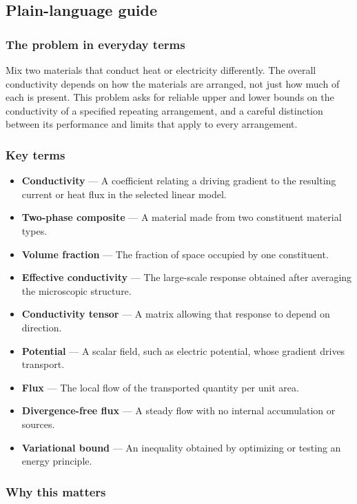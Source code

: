 \documentclass[
  11pt,
]{article}
\begin{document}
\subsection{Plain-language guide}

\subsubsection{The problem in everyday terms}

Mix two materials that conduct heat or electricity differently. The
overall conductivity depends on how the materials are arranged, not just
how much of each is present. This problem asks for reliable upper and
lower bounds on the conductivity of a specified repeating arrangement,
and a careful distinction between its performance and limits that apply
to every arrangement.

\subsubsection{Key terms}

\begin{itemize}
\item
  \textbf{Conductivity} --- A coefficient relating a driving gradient to
  the resulting current or heat flux in the selected linear model.
\item
  \textbf{Two-phase composite} --- A material made from two constituent
  material types.
\item
  \textbf{Volume fraction} --- The fraction of space occupied by one
  constituent.
\item
  \textbf{Effective conductivity} --- The large-scale response obtained
  after averaging the microscopic structure.
\item
  \textbf{Conductivity tensor} --- A matrix allowing that response to
  depend on direction.
\item
  \textbf{Potential} --- A scalar field, such as electric potential,
  whose gradient drives transport.
\item
  \textbf{Flux} --- The local flow of the transported quantity per unit
  area.
\item
  \textbf{Divergence-free flux} --- A steady flow with no internal
  accumulation or sources.
\item
  \textbf{Variational bound} --- An inequality obtained by optimizing or
  testing an energy principle.
\end{itemize}

\subsubsection{Why this matters}
\end{document}
